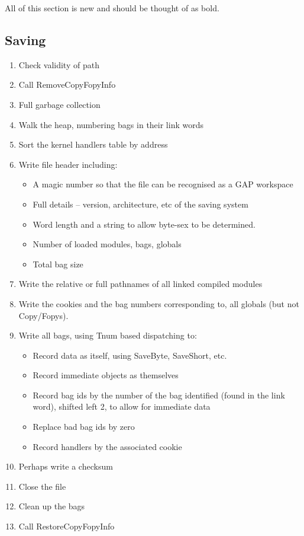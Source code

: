 \documentclass[11pt]{article}
\begin{document}
All of this section is new and should be thought of as bold.

\subsection{Saving}

\begin{enumerate}
\item Check validity of path
\item Call RemoveCopyFopyInfo
\item Full garbage collection
\item Walk the heap, numbering bags in their link words
\item Sort the kernel handlers table by address
\item Write file header including:
\begin{itemize}
\item A magic number so that the file can be recognised as a GAP
workspace
\item Full details -- version, architecture, etc of the saving system
\item Word length and a string to allow byte-sex to be determined.
\item Number of loaded modules, bags, globals
\item Total bag size
\end{itemize}
\item Write the relative or full pathnames of all linked
compiled modules
\item Write the cookies and the bag numbers corresponding to, all
globals (but not Copy/Fopys).
\item Write all bags, using Tnum based dispatching to:
\begin{itemize}
\item Record data as itself, using SaveByte, SaveShort, etc.
\item Record immediate objects as themselves
\item Record bag ids by the number of the bag identified (found in the
link word), shifted left 2, to allow for immediate data
\item Replace bad bag ids by zero
\item Record handlers by the associated cookie
\end{itemize}
\item Perhaps write a checksum
\item Close the file
\item Clean up the bags
\item Call RestoreCopyFopyInfo
\end{enumerate}
\end{document}
